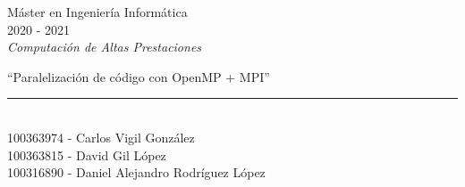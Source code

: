 \documentclass[12pt]{report} %
\begin{document}

\begin{titlepage}
	\begin{sffamily}
	\color{azulUC3M}
	\begin{center}
		\begin{figure}[H] %
		\end{figure}
		\vspace{2.5cm}
		\begin{Large}
			Máster en Ingeniería Informática\\
			2020 - 2021\\
			\vspace{2cm}
			\textsl{Computación de Altas Prestaciones}
			\bigskip

		\end{Large}
		 	{\Huge ``Paralelización de código con OpenMP + MPI''}\\
		 	\vspace*{0.5cm}
	 		\rule{10.5cm}{0.1mm}\\
			\vspace*{0.9cm}
			{\LARGE 100363974 - Carlos Vigil González}\\
            {\LARGE 100363815 - David Gil López}\\
			{\LARGE 100316890 - Daniel Alejandro Rodríguez López}\\
			\vspace*{1cm}
	\end{center}
	\vfill
	\color{black}
	\end{sffamily}
\end{titlepage}

\tableofcontents
\thispagestyle{fancy}
\end{document}
